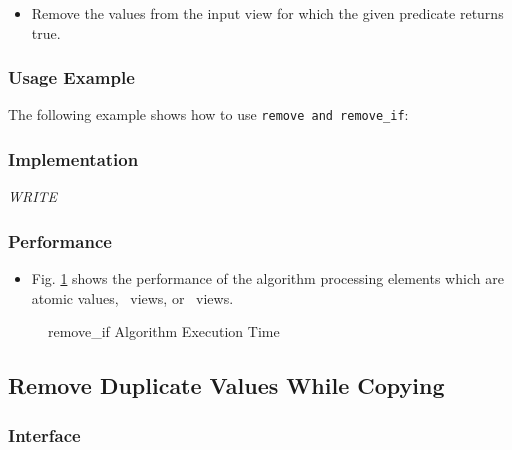\begin{itemize}
\item
Remove the values from the input view for which the given predicate returns true. 
\end{itemize}
 
\subsubsection{Usage Example} %

The following example shows how to use \texttt{remove and remove\_if}:

 
\subsubsection{Implementation} %

\textit{WRITE}

\subsubsection{Performance} %

\begin{itemize}
\item
Fig. \ref{fig:remv-if-alg-exec-exper}
shows the performance of the algorithm processing
elements which are atomic values, \stl\ views, or \stapl\ views.
\end{itemize}

\begin{figure}[p]
\caption{remove\_if Algorithm Execution Time}
\label{fig:remv-if-alg-exec-exper}
\end{figure}

 
\subsection{Remove Duplicate Values While Copying} \label{sec-remv-uniq_copy}

\subsubsection{Interface} %

